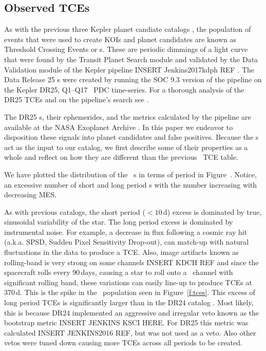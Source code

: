 \subsection{Observed TCEs}

\label{tces}
As with the previous three Kepler planet candiate catalogs \citep{Coughlin2016,Mullally2015cat,Rowe2015cat}, the population of events that were used to create KOIs and planet candidates are known as Threshold Crossing Events or \opstce s.  These are periodic dimmings of a light curve that were found by the Transit Planet Search module and validated by the Data Validation module of the Kepler pipeline INSERT Jenkins2017kdph REF \citep{Fanelli2011}.   The Data Release 25 \opstce s were created by running the SOC 9.3 version of the pipeline on the Kepler DR25, Q1--Q17 \Kepler\ PDC time-series.  For a thorough analysis of the DR25 TCEs and on the pipeline's search see \citet{Twicken2016}.  

The DR25 \opstce s, their ephemerides, and the metrics calculated by the pipeline are available at the NASA Exoplanet Archive \citep{Akeson2013}.  In this paper we endeavor to disposition these signals into planet candidates and false positives.   Because the \opstce s act as the input to our catalog, we first describe some of their properties as a whole and reflect on how they are different than the previous \Kepler\ TCE table.

We have plotted the distribution of the \ntcesnorogue\ \opstce s in terms of period in Figure~\label{f:tces}. Notice, an excessive number of short and long period \opstce s with the number increasing with decreasing MES. 

As with previous catalogs, the short period ($<10$\,d) excess is dominated by true, sinusoidal variability of the star. The long period excess is dominated by instrumental noise. For example, a decrease in flux following a cosmic ray hit (a.k.a. SPSD, Sudden Pixel Sensitivity Drop-out), can match-up with natural fluctuations in the data to produce a TCE. Also, image artifacts known as rolling-band is very strong on some channels INSERT KDCH REF\citep[see page][]{KDCH}  and since the spacecraft rolls every 90\,days, causing a star to roll onto a \Kepler\ channel with significant rolling band, these variations can easily line-up to produce TCEs at 370\,d. This is the spike in the \opstce\ population seen in Figure~\ref{f:tces}. This excess of long period TCEs is significantly larger than in the DR24 catalog \citep{Seader2015}. Most likely, this is because DR24 implemented an aggressive and irregular veto known as the bootstrap metric \citep{}INSERT JENKINS KSCI HERE.  For DR25 this metric was calculated INSERT JENKINS2016 REF, but was not used as a veto.  Also other vetos were tuned down causing more TCEs across all periods to be created.  %

